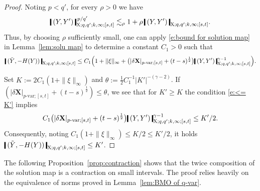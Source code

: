 \documentclass[11pt,reqno]{amsart}
\numberwithin{equation}{section}
\newcommand{\shortthickbar}{%
  \vcenter{\hbox{\rule{1.8pt}{2.2ex}}}%
}
\newcommand{\thicknm}[1]{%
  \mathopen{\shortthickbar}%
  \mkern4mu #1 \mkern4mu%
  \mathclose{\shortthickbar}%
}
\begin{document}
\begin{proof}
Noting $p < q'$, for every $\rho > 0$  we have 
\begin{equation*}
\thicknm{(Y,Y')}_{\mathrm X;q,q';k,\infty;[s,t]}^{\,p/q'} \lesssim_{\rho} 1 + \rho\, \thicknm{(Y,Y')}_{\mathrm X;q,q';k,\infty;[s,t]}.
\end{equation*}
Thus, by choosing $\rho$ sufficiently small, one can apply \eqref{e:bound for solution map} in Lemma~\ref{lem:solu map} to determine a constant $C_1 > 0$ such that 
\begin{equation*}
\begin{aligned}
\thicknm{(\tilde Y,- H (Y))}_{\mathrm X;q,q';k,\infty;[s,t]} \le C_1 \Big( 1 + \|\xi\|_{\infty} + \big(|\delta \mathbf X|_{p\text{-}\mathrm{var};[s,t]} + (t - s)^{\frac{1}{2}}\big) \thicknm{( Y,Y')}^{\gamma - 1}_{\mathrm X;q,q';k,\infty;[s,t]} \Big). 
\end{aligned}
\end{equation*}

Set $K := 2C_1 ( 1 + \|\xi\|_{\infty} )$ and $\theta := \frac{1}{2} C^{-1}_1 | K'|^{-(\gamma - 2)}$. If $(|\delta \mathbf X|_{p\text{-}\mathrm{var};[s,t]} + (t - s)^{\frac{1}{2}}) \le \theta$, we see that for $K' \ge K$ the condition \eqref{e:<= K'} implies 
\begin{equation*}
C_1 \big(|\delta \mathbf X|_{p\text{-}\mathrm{var};[s,t]} + (t - s)^{\frac{1}{2}} \big) \thicknm{( Y,Y')}^{\gamma - 1}_{\mathrm X;q,q';k,\infty;[s,t]} 
\le K'/2.
\end{equation*}
Consequently, noting $C_1 (1 + \|\xi\|_{\infty}) \le K/2 \le K'/2$, it holds $\thicknm{(\tilde Y,- H (Y))}_{\mathrm X;q,q';k,\infty;[s,t]} \le K'$. 
\end{proof}

The following Proposition~\ref{prop:contraction} shows that the twice composition of the solution map is a contraction on small intervals. The proof relies heavily on the  equivalence of norms proved in Lemma~\ref{lem:BMO of q-var}. 
\end{document}
